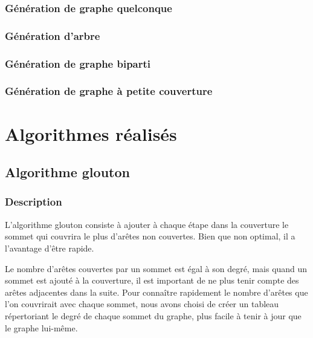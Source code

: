 \documentclass[a4paper,10pt]{article}
\begin{document}
\subsubsection{Génération de graphe quelconque}

\subsubsection{Génération d'arbre}

\subsubsection{Génération de graphe biparti}

\subsubsection{Génération de graphe à petite couverture}



\section{Algorithmes réalisés}

\subsection{Algorithme glouton}

\subsubsection{Description}

L'algorithme glouton consiste à ajouter à chaque étape dans la couverture le sommet qui couvrira le plus d'arêtes non couvertes. Bien que non optimal, il a l'avantage d'être rapide. 

Le nombre d'arêtes couvertes par un sommet est égal à son degré, mais quand un sommet est ajouté à la couverture, il est important de ne plus tenir compte des arêtes adjacentes dans la suite. Pour connaître rapidement le nombre d'arêtes que l'on couvrirait avec chaque sommet, nous avons choisi de créer un tableau répertoriant le degré de chaque sommet du graphe, plus facile à tenir à jour que le graphe lui-même. 
\end{document}
